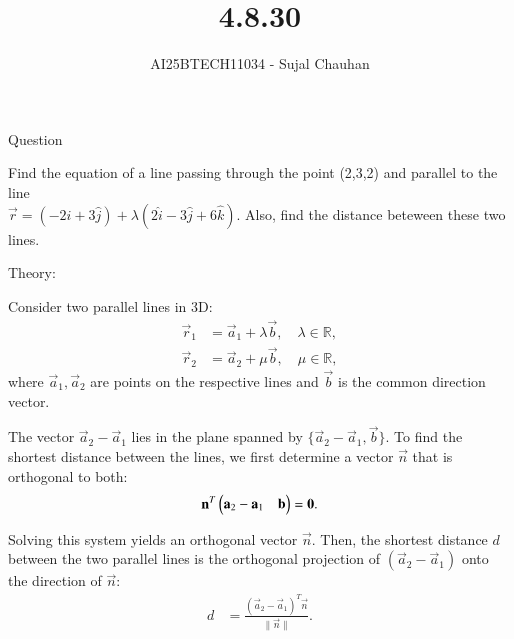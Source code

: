 \documentclass{beamer}
\title
{4.8.30}
\author 
{AI25BTECH11034 - Sujal Chauhan }
\begin{document}
\frame{\titlepage}
\begin{frame}{Question}

Find the equation of a line passing through the point (2,3,2) and parallel to the line \\
$\Vec{r}= (-2\hat{i}+3\hat{j})+\lambda(2\hat{i}-3\hat{j}+6\hat{k})$. Also, find the distance beteween these two lines.\\[2cm]
\end{frame}
\begin{frame}{Theory:}


Consider two parallel lines in 3D:
\begin{align}
    \vec{r}_1 &= \vec{a}_1 + \lambda \vec{b}, \quad \lambda \in \mathbb{R}, \\[6pt]
    \vec{r}_2 &= \vec{a}_2 + \mu \vec{b}, \quad \mu \in \mathbb{R},
\end{align}
where $\vec{a}_1, \vec{a}_2$ are points on the respective lines and $\vec{b}$ is the common direction vector.  

The vector $\vec{a}_2 - \vec{a}_1$ lies in the plane spanned by $\{\vec{a}_2 - \vec{a}_1, \vec{b}\}$.  
To find the shortest distance between the lines, we first determine a vector $\vec{n}$ that is orthogonal to both:
\begin{align}
    \mathbf{n}^T \begin{pmatrix} \mathbf{a}_2 - \mathbf{a}_1 & \mathbf{b} \end{pmatrix} = \mathbf{0}.
\end{align}

Solving this system yields an orthogonal vector $\vec{n}$.  
Then, the shortest distance $d$ between the two parallel lines is the orthogonal projection of $(\vec{a}_2 - \vec{a}_1)$ onto the direction of $\vec{n}$:
\begin{align}
    d &= \frac{(\vec{a}_2 - \vec{a}_1)^T \vec{n} }{\|\vec{n}\|}.
\end{align}
\end{frame}
\end{document}
